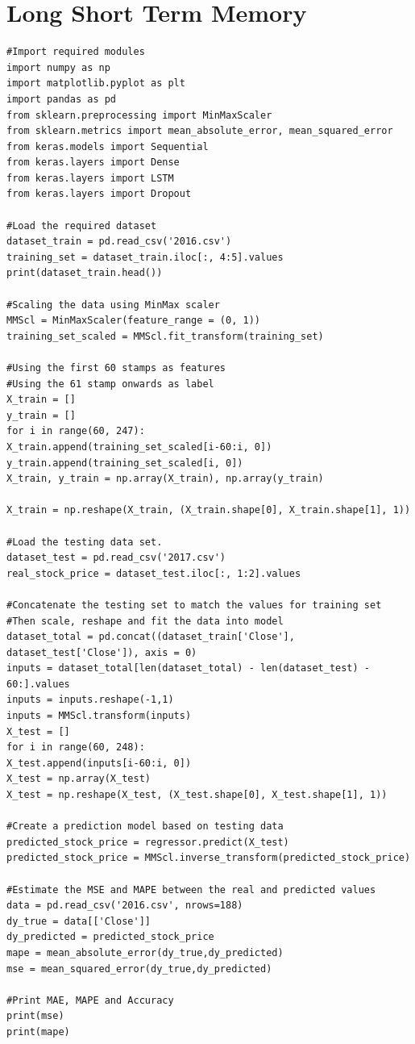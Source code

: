 \documentclass[BTech]{srmuthesis}
\begin{document}
\section{Long Short Term Memory}

\lstset{%
	breaklines=true,
	breakatwhitespace=true,
}

\begin{lstlisting}
#Import required modules
import numpy as np
import matplotlib.pyplot as plt
import pandas as pd
from sklearn.preprocessing import MinMaxScaler
from sklearn.metrics import mean_absolute_error, mean_squared_error
from keras.models import Sequential
from keras.layers import Dense
from keras.layers import LSTM
from keras.layers import Dropout

#Load the required dataset
dataset_train = pd.read_csv('2016.csv')
training_set = dataset_train.iloc[:, 4:5].values
print(dataset_train.head())

#Scaling the data using MinMax scaler
MMScl = MinMaxScaler(feature_range = (0, 1))
training_set_scaled = MMScl.fit_transform(training_set)

#Using the first 60 stamps as features
#Using the 61 stamp onwards as label
X_train = []
y_train = []
for i in range(60, 247):
X_train.append(training_set_scaled[i-60:i, 0])
y_train.append(training_set_scaled[i, 0])
X_train, y_train = np.array(X_train), np.array(y_train)

X_train = np.reshape(X_train, (X_train.shape[0], X_train.shape[1], 1))

#Load the testing data set.
dataset_test = pd.read_csv('2017.csv')
real_stock_price = dataset_test.iloc[:, 1:2].values

#Concatenate the testing set to match the values for training set
#Then scale, reshape and fit the data into model
dataset_total = pd.concat((dataset_train['Close'], dataset_test['Close']), axis = 0)
inputs = dataset_total[len(dataset_total) - len(dataset_test) - 60:].values
inputs = inputs.reshape(-1,1)
inputs = MMScl.transform(inputs)
X_test = []
for i in range(60, 248):
X_test.append(inputs[i-60:i, 0])
X_test = np.array(X_test)
X_test = np.reshape(X_test, (X_test.shape[0], X_test.shape[1], 1))

#Create a prediction model based on testing data
predicted_stock_price = regressor.predict(X_test)
predicted_stock_price = MMScl.inverse_transform(predicted_stock_price)

#Estimate the MSE and MAPE between the real and predicted values
data = pd.read_csv('2016.csv', nrows=188)
dy_true = data[['Close']]
dy_predicted = predicted_stock_price
mape = mean_absolute_error(dy_true,dy_predicted)
mse = mean_squared_error(dy_true,dy_predicted)

#Print MAE, MAPE and Accuracy
print(mse)
print(mape)
\end{lstlisting}
\pagebreak
\end{document}
